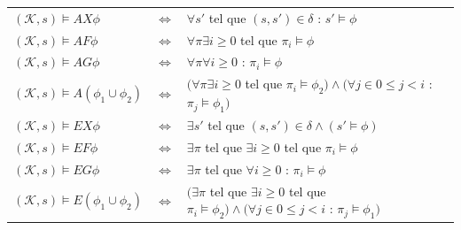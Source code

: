 \documentclass[runningheads,a4paper,10pt]{llncs}
\begin{document}
 
\begin{center}
\begin{tabular}{lll}
   $(\mathcal{K},s) \vDash AX\phi$ & \hspace{0.5cm} $\Leftrightarrow$ \hspace{0.5cm} & $\forall s'$ tel que $(s,s')\in \delta$ : $s' \vDash \phi$  \\
   $(\mathcal{K},s) \vDash AF\phi$ & \hspace{0.5cm} $\Leftrightarrow$ \hspace{0.5cm} & $\forall \pi \exists i\ge 0$ tel que $\pi_{i} \vDash \phi$  \\
   $(\mathcal{K},s) \vDash AG\phi$ & \hspace{0.5cm} $\Leftrightarrow$ \hspace{0.5cm} & $\forall \pi \forall i\ge 0$ : $\pi_{i} \vDash \phi$  \\
   $(\mathcal{K},s) \vDash A(\phi_{1} \cup \phi_{2})$ & \hspace{0.5cm} $\Leftrightarrow$ \hspace{0.5cm} & $(\forall \pi \exists i\ge 0$ tel que $\pi_{i} \vDash \phi_{2}) \wedge (\forall j \in 0 \le j < i$ : $\pi_{j} \vDash \phi_{1})$ \\
   $(\mathcal{K},s) \vDash EX\phi$ & \hspace{0.5cm} $\Leftrightarrow$ \hspace{0.5cm} & $\exists s'$ tel que $(s,s')\in \delta \wedge (s' \vDash \phi)$  \\
   $(\mathcal{K},s) \vDash EF\phi$ & \hspace{0.5cm} $\Leftrightarrow$ \hspace{0.5cm} & $\exists \pi$ tel que $\exists i \ge 0$ tel que $\pi_{i} \vDash \phi$  \\
   $(\mathcal{K},s) \vDash EG\phi$ & \hspace{0.5cm} $\Leftrightarrow$ \hspace{0.5cm} & $\exists \pi$ tel que $\forall i\ge 0$ : $\pi_{i} \vDash \phi$  \\
   $(\mathcal{K},s) \vDash E(\phi_{1} \cup \phi_{2})$ & \hspace{0.5cm} $\Leftrightarrow$ \hspace{0.5cm} & $(\exists \pi$ tel que $\exists i \ge 0$ tel que $\pi_{i} \vDash \phi_{2}) \wedge (\forall j \in 0 \le j < i$ : $\pi_{j} \vDash \phi_{1})$ \\
\end{tabular}
\end{center}
\end{document}
